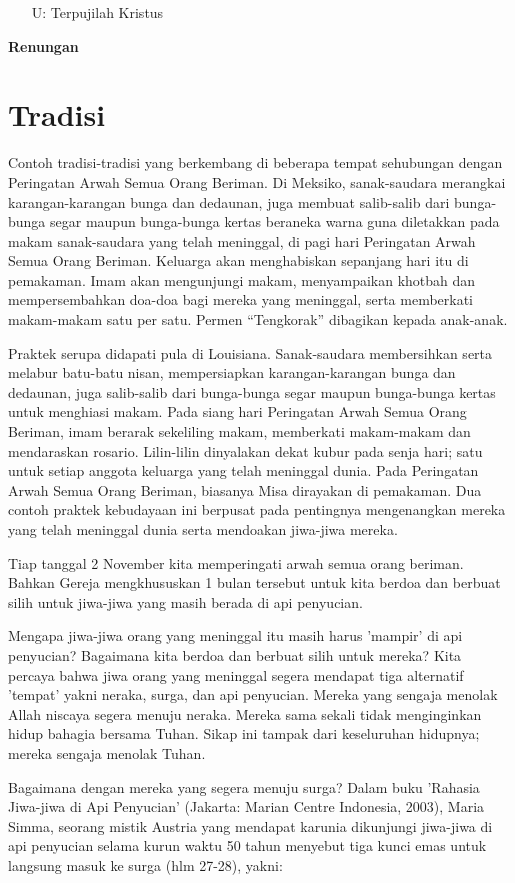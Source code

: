 \documentclass[a5paper,headsepline,titlepage,10pt,nnormalheadings,DIVcalc]{scrbook}
\makeatletter
\newcommand{\subjudul}[1]{%
  {\parindent \z@ 
    \interlinepenalty\@M \bfseries #1\par\nobreak \vskip 10\p@ }}
\newcommand{\BU}[1]{\begin{itemize} \item[U:] #1 \end{itemize}}
\makeatother
\begin{document}
\BU{Terpujilah Kristus}

\subjudul{Renungan}
\section*{Tradisi}
Contoh tradisi-tradisi yang berkembang di beberapa tempat sehubungan dengan Peringatan Arwah Semua Orang Beriman. Di Meksiko, sanak-saudara merangkai karangan-karangan bunga dan dedaunan, juga membuat salib-salib dari bunga-bunga segar maupun bunga-bunga kertas beraneka warna guna diletakkan pada makam sanak-saudara yang telah meninggal, di pagi hari Peringatan Arwah Semua Orang Beriman. Keluarga akan menghabiskan sepanjang hari itu di pemakaman. Imam akan mengunjungi makam, menyampaikan khotbah dan mempersembahkan doa-doa bagi mereka yang meninggal, serta memberkati makam-makam satu per satu. Permen “Tengkorak” dibagikan kepada anak-anak.

Praktek serupa didapati pula di Louisiana. Sanak-saudara membersihkan serta melabur batu-batu nisan, mempersiapkan karangan-karangan bunga dan dedaunan, juga salib-salib dari bunga-bunga segar maupun bunga-bunga kertas untuk menghiasi makam. Pada siang hari Peringatan Arwah Semua Orang Beriman, imam berarak sekeliling makam, memberkati makam-makam dan mendaraskan rosario. Lilin-lilin dinyalakan dekat kubur pada senja hari; satu untuk setiap anggota keluarga yang telah meninggal dunia. Pada Peringatan Arwah Semua Orang Beriman, biasanya Misa dirayakan di pemakaman. Dua contoh praktek kebudayaan ini berpusat pada pentingnya mengenangkan mereka yang telah meninggal dunia serta mendoakan jiwa-jiwa mereka.

Tiap tanggal 2 November kita memperingati arwah semua orang beriman.
Bahkan Gereja mengkhususkan 1 bulan tersebut untuk kita berdoa dan berbuat silih untuk jiwa-jiwa yang masih berada di api penyucian.

Mengapa jiwa-jiwa orang yang meninggal itu masih harus 'mampir' di api penyucian?
Bagaimana kita berdoa dan berbuat silih untuk mereka? Kita percaya bahwa jiwa orang yang meninggal segera mendapat tiga alternatif 'tempat' yakni neraka, surga, dan api penyucian. Mereka yang sengaja menolak Allah niscaya segera menuju neraka. Mereka sama sekali tidak menginginkan hidup bahagia bersama Tuhan. Sikap ini tampak dari keseluruhan hidupnya; mereka sengaja menolak Tuhan.


Bagaimana dengan mereka yang segera menuju surga?
Dalam buku 'Rahasia Jiwa-jiwa di Api Penyucian' (Jakarta: Marian Centre Indonesia, 2003), Maria Simma, seorang mistik Austria yang mendapat karunia dikunjungi jiwa-jiwa di api penyucian selama kurun waktu 50 tahun menyebut tiga kunci emas untuk langsung masuk ke surga (hlm 27-28), yakni:
\end{document}

